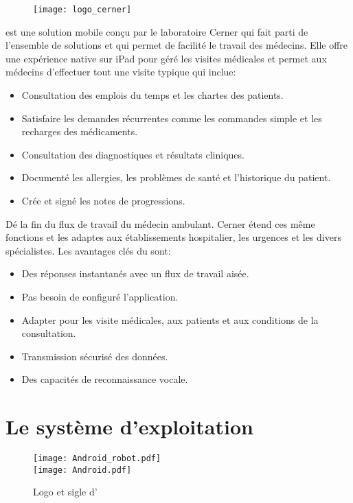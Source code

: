 \begin{figure}[H]
\centering
\texttt{[image: logo\_cerner]}
\end{figure}

\pct{} est une solution mobile conçu par le laboratoire Cerner qui
fait parti de l'ensemble de solutions  et qui permet de
facilité le travail des médecins. Elle offre une expérience native
sur iPad pour géré les visites médicales et permet aux médecins
d'effectuer tout une visite typique qui inclue:~\cite{pct:flyer}
\begin{itemize}
\item Consultation des emplois du temps et les chartes des patients.
\item Satisfaire les demandes récurrentes comme les commandes simple
et les recharges des médicaments.
\item Consultation des diagnostiques et résultats cliniques.
\item Documenté les allergies, les problèmes de santé et l'historique
du patient.
\item Crée et signé les notes de progressions.
\end{itemize}

Dé la fin du flux de travail du médecin ambulant. Cerner étend ces
même fonctions et les adaptes aux établissements hospitalier, les
urgences et les divers spécialistes.
Les avantages clés du \pct{} sont:~\cite{pct:flyer}
\begin{itemize}
\item Des réponses instantanés avec un flux de travail aisée.
\item Pas besoin de configuré l'application.
\item Adapter pour les visite médicales, aux patients et aux conditions
de la consultation.
\item Transmission sécurisé des données.
\item Des capacités de reconnaissance vocale.
\end{itemize}

\section{Le système d'exploitation \android{}}

\begin{figure}[H]
\begin{center}
\texttt{[image: Android\_robot.pdf]}\\
\texttt{[image: Android.pdf]}
\end{center}
\caption{Logo et sigle d'\android{}}
\end{figure}

